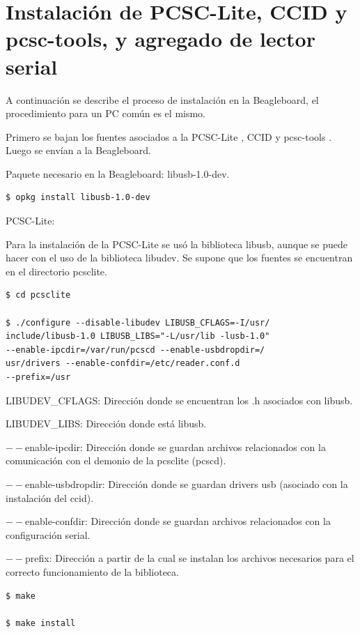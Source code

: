 \section{Instalación de PCSC-Lite, CCID y pcsc-tools, y agregado de lector serial}\label{anx_pcsc_inst}

A continuación se describe el proceso de instalación en la Beagleboard, el procedimiento para un PC común es el mismo.

\bigskip
Primero se bajan los fuentes asociados a la PCSC-Lite \cite{pcsc/ccid_down}, CCID \cite{pcsc/ccid_down} y pcsc-tools \cite{pcsctools_down}. Luego se envían a la Beagleboard.

\bigskip
Paquete necesario en la Beagleboard: libusb-1.0-dev.

\begin{verbatim}
$ opkg install libusb-1.0-dev
\end{verbatim}

PCSC-Lite:

\bigskip
Para la instalación de la PCSC-Lite se usó la biblioteca libusb, aunque se puede hacer con el uso de la biblioteca libudev.
Se supone que los fuentes se encuentran en el directorio pcsclite.

\begin{verbatim}
$ cd pcsclite

$ ./configure --disable-libudev LIBUSB_CFLAGS=-I/usr/
include/libusb-1.0 LIBUSB_LIBS="-L/usr/lib -lusb-1.0" 
--enable-ipcdir=/var/run/pcscd --enable-usbdropdir=/
usr/drivers --enable-confdir=/etc/reader.conf.d 
--prefix=/usr
\end{verbatim}

LIBUDEV\_CFLAGS: Dirección donde se encuentran los .h asociados con libusb.

LIBUDEV\_LIBS: Dirección donde está libusb.

$--$enable-ipcdir: Dirección donde se guardan archivos relacionados con la comunicación con el demonio de la pcsclite (pcscd).

$--$enable-usbdropdir: Dirección donde se guardan drivers usb (asociado con la instalación del ccid).

$--$enable-confdir: Dirección donde se guardan archivos relacionados con la configuración serial.

$--$prefix:  Dirección a partir de la cual se instalan los archivos necesarios para el correcto funcionamiento de la biblioteca.

\begin{verbatim}
$ make

$ make install
\end{verbatim}


